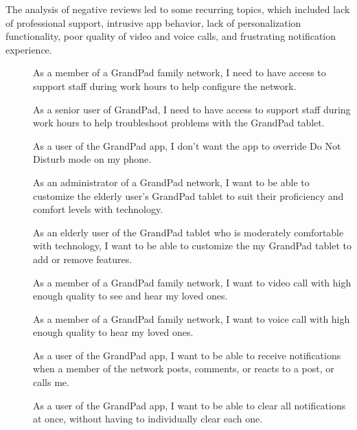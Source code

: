 The analysis of negative reviews led to some recurring topics, which included
    lack of professional support,
    intrusive app behavior,
    lack of personalization functionality,
    poor quality of video and voice calls,
    and frustrating notification experience.

\begin{description}
    \item[\textbf{\showuserhelpcounter}]
        As a member of a GrandPad family network, I need to have access to
            support staff during work hours to help configure the network.
    \item[\textbf{\showuserhelpcounter}]
        As a senior user of GrandPad, I need to have access to support staff
            during work hours to help troubleshoot problems with the GrandPad
            tablet.
    \item[\textbf{\showuseruicounter}]
        As a user of the GrandPad app, I don't want the app to override
            Do Not Disturb mode on my phone.
    \item[\textbf{\showuseruicounter}]
        As an administrator of a GrandPad network, I want to be able to
            customize the elderly user's GrandPad tablet to suit their
            proficiency and comfort levels with technology.
    \item[\textbf{\showuseruicounter}]
        As an elderly user of the GrandPad tablet who is moderately comfortable
            with technology, I want to be able to customize the my GrandPad
            tablet to add or remove features.
    \item[\textbf{\showusercallcounter}]
        As a member of a GrandPad family network, I want to video call with high
            enough quality to see and hear my loved ones.
    \item[\textbf{\showusercallcounter}]
        As a member of a GrandPad family network, I want to voice call with high
            enough quality to hear my loved ones.
    \item[\textbf{\showuserpostcounter}]
        As a user of the GrandPad app, I want to be able to receive
            notifications when a member of the network posts, comments, or
            reacts to a post, or calls me.
    \item[\textbf{\showuseruicounter}]
        As a user of the GrandPad app, I want to be able to clear all
            notifications at once, without having to individually clear each
            one.
\end{description}

